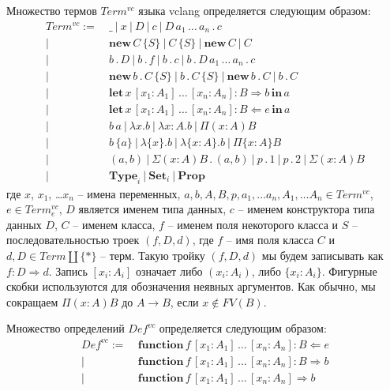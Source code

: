 \documentclass{amsart}
\theoremstyle{definition}
\theoremstyle{remark}
\newcommand{\red}{\Rightarrow}
\numberwithin{figure}{section}
\begin{document}
Множество термов $Term^{vc}$ языка vclang определяется следующим образом:
\begin{align*}
Term^{vc} :=\ & \_\ |\ x\ |\ D\ |\ c\ |\ D\,a_1\,\ldots\,a_n\,.\,c \\
      |\ & \mathbf{new}\,C\,\{ S \}\ |\ C\,\{ S \}\ |\ \mathbf{new}\,C\ |\ C \\
      |\ & b\,.\,D\ |\ b\,.\,f\ |\ b\,.\,c\ |\ b\,.\,D\,a_1\,\ldots\,a_n\,.\,c \\
      |\ & \mathbf{new}\,b\,.\,C\,\{ S \}\ |\ b\,.\,C\,\{ S \}\ |\ \mathbf{new}\,b\,.\,C\ |\ b\,.\,C \\
      |\ & \mathbf{let}\,x\,[x_1 : A_1]\,\ldots\,[x_n : A_n] : B \Rightarrow b\,\mathbf{in}\,a \\
      |\ & \mathbf{let}\,x\,[x_1 : A_1]\,\ldots\,[x_n : A_n] : B \Leftarrow e\,\mathbf{in}\,a \\
      |\ & b\,a\ |\ \lambda x. b\ |\ \lambda x : A. b\ |\ \Pi (x : A) B \\
      |\ & b\,\{a\}\ |\ \lambda \{x\}. b\ |\ \lambda \{x : A\}. b\ |\ \Pi \{x : A\} B \\
      |\ & (a,b)\ |\ \Sigma (x : A) B\,.\,(a,b)\ |\ p\,.\,1\ |\ p\,.\,2\ |\ \Sigma (x : A) B \\
      |\ & \mathbf{Type}_i\ |\ \mathbf{Set}_i\ |\ \mathbf{Prop}
\end{align*}
где $x$, $x_1$, \ldots $x_n$ -- имена переменных, $a, b, A, B, p, a_1, \ldots a_n, A_1, \ldots A_n \in Term^{vc}$, $e \in Term^{vc}_e$, $D$ является именем типа данных, $c$ -- именем конструктора типа данных $D$, $C$ -- именем класса, $f$ -- именем поля некоторого класса и $S$ -- последовательностью троек $(f,D,d)$, где $f$ -- имя поля класса $C$ и $d,D \in Term \amalg \{ * \}$ -- терм.
Такую тройку $(f,D,d)$ мы будем записывать как $f : D \red d$.
Запись $[x_i : A_i]$ означает либо $(x_i : A_i)$, либо $\{x_i : A_i\}$.
Фигурные скобки используются для обозначения неявных аргументов.
Как обычно, мы сокращаем $\Pi (x : A) B$ до $A \to B$, если $x \notin FV(B)$.

Множество определений $Def^{vc}$ определяется следующим образом:
\begin{align*}
Def^{vc} :=\ & \mathbf{function}\,f\,[x_1 : A_1]\,\ldots\,[x_n : A_n] : B \Leftarrow e \\
    |\ & \mathbf{function}\,f\,[x_1 : A_1]\,\ldots\,[x_n : A_n] : B \Rightarrow b \\
    |\ & \mathbf{function}\,f\,[x_1 : A_1]\,\ldots\,[x_n : A_n] \Rightarrow b \\
\end{align*}
\end{document}
